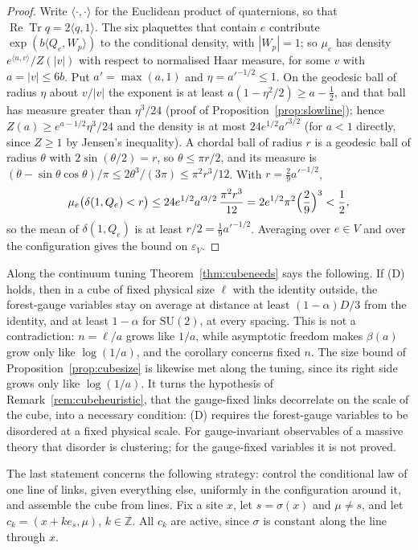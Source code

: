 \documentclass[11pt]{amsart}
\theoremstyle{definition}
\theoremstyle{remark}
\numberwithin{equation}{section}
\newcommand{\Z}{\mathbb{Z}}
\newcommand{\SU}{\mathrm{SU}}
\newcommand{\ReTr}{\operatorname{Re}\operatorname{Tr}}
\begin{document}
\begin{proof}
Write $\langle\cdot,\cdot\rangle$ for the Euclidean product of quaternions,
so that $\ReTr q=2\langle q,1\rangle$. The six plaquettes that contain $e$
contribute $\exp(b\langle Q_e,W_p\rangle)$ to the conditional density, with
$|W_p|=1$; so $\mu_e$ has density $e^{\langle u,v\rangle}/Z(|v|)$ with respect
to normalised Haar measure, for some $v$ with $a=|v|\le6b$. Put
$a'=\max(a,1)$ and $\eta=a'^{-1/2}\le1$. On the geodesic ball of radius $\eta$
about $v/|v|$ the exponent is at least $a(1-\eta^2/2)\ge a-\frac12$, and that
ball has measure greater than $\eta^3/24$ (proof of
Proposition~\ref{prop:slowline}); hence $Z(a)\ge e^{a-1/2}\eta^3/24$ and the
density is at most $24e^{1/2}a'^{3/2}$ (for $a<1$ directly, since $Z\ge1$ by
Jensen's inequality). A chordal ball of radius $r$ is a geodesic ball of
radius $\theta$ with $2\sin(\theta/2)=r$, so $\theta\le\pi r/2$, and its
measure is $(\theta-\sin\theta\cos\theta)/\pi\le2\theta^3/(3\pi)\le\pi^2r^3/12$.
With $r=\frac29a'^{-1/2}$,
\[
\mu_e\bigl(\delta(1,Q_e)<r\bigr)\le24e^{1/2}a'^{3/2}\,\frac{\pi^2r^3}{12}
=2e^{1/2}\pi^2\Bigl(\frac29\Bigr)^3<\frac12 ,
\]
so the mean of $\delta(1,Q_e)$ is at least $r/2=\frac19a'^{-1/2}$. Averaging
over $e\in V$ and over the configuration gives the bound on $\varepsilon_V$.
\end{proof}

Along the continuum tuning Theorem~\ref{thm:cubeneeds} says the following.
If (D) holds, then in a cube of fixed physical size $\ell$ with the identity
outside, the forest-gauge variables stay on average at distance at least
$(1-\alpha)D/3$ from the identity, and at least $1-\alpha$ for $\SU(2)$, at
every spacing. This is not a
contradiction: $n=\ell/a$ grows like $1/a$, while asymptotic freedom makes
$\beta(a)$ grow only like $\log(1/a)$, and the corollary concerns fixed $n$.
The size bound of Proposition~\ref{prop:cubesize} is likewise met along the
tuning, since its right side grows only like $\log(1/a)$.
It turns the hypothesis of Remark~\ref{rem:cubeheuristic}, that the
gauge-fixed links decorrelate on the scale of the cube, into a necessary
condition: (D) requires the forest-gauge variables to be disordered at a
fixed physical scale. For gauge-invariant observables of a massive theory
that disorder is clustering; for the gauge-fixed variables it is not proved.

The last statement concerns the following strategy: control the
conditional law of one line of links, given everything else, uniformly in
the configuration around it, and assemble the cube from lines. Fix a site
$x$, let $s=\sigma(x)$ and $\mu\ne s$, and let $c_k=(x+ke_s,\mu)$, $k\in\Z$.
All $c_k$ are active, since $\sigma$ is constant along the line through $x$.
\end{document}

